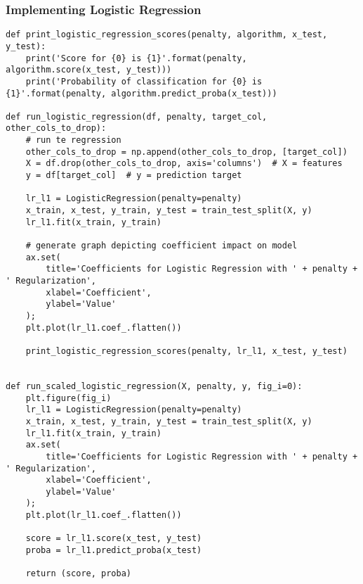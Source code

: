 \subsubsection{Implementing Logistic Regression}

\begin{code}
\label{code:logistic-reg-impl}
\begin{verbatim}
def print_logistic_regression_scores(penalty, algorithm, x_test, y_test):
    print('Score for {0} is {1}'.format(penalty, algorithm.score(x_test, y_test)))
    print('Probability of classification for {0} is {1}'.format(penalty, algorithm.predict_proba(x_test)))

def run_logistic_regression(df, penalty, target_col, other_cols_to_drop):
    # run te regression
    other_cols_to_drop = np.append(other_cols_to_drop, [target_col])
    X = df.drop(other_cols_to_drop, axis='columns')  # X = features
    y = df[target_col]  # y = prediction target

    lr_l1 = LogisticRegression(penalty=penalty)
    x_train, x_test, y_train, y_test = train_test_split(X, y)
    lr_l1.fit(x_train, y_train)
    
    # generate graph depicting coefficient impact on model
    ax.set(
        title='Coefficients for Logistic Regression with ' + penalty + ' Regularization',
        xlabel='Coefficient',
        ylabel='Value'
    );
    plt.plot(lr_l1.coef_.flatten())

    print_logistic_regression_scores(penalty, lr_l1, x_test, y_test)


def run_scaled_logistic_regression(X, penalty, y, fig_i=0):
    plt.figure(fig_i)
    lr_l1 = LogisticRegression(penalty=penalty)
    x_train, x_test, y_train, y_test = train_test_split(X, y)
    lr_l1.fit(x_train, y_train)
    ax.set(
        title='Coefficients for Logistic Regression with ' + penalty + ' Regularization',
        xlabel='Coefficient',
        ylabel='Value'
    );
    plt.plot(lr_l1.coef_.flatten())

    score = lr_l1.score(x_test, y_test)
    proba = lr_l1.predict_proba(x_test)

    return (score, proba)
\end{verbatim}
\end{code}